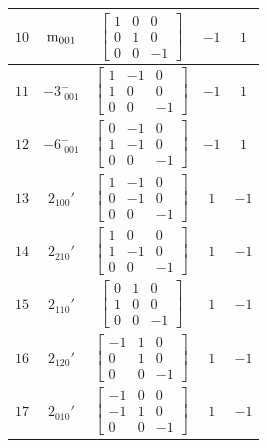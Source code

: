 \documentclass[fleqn,8pt]{jsarticle}
\begin{document}
\begin{longtable}{ccccc}
$ 10 $ & $ {\rm m}_{001} $ & $ \begin{bmatrix} 1 & 0 & 0 \\ 0 & 1 & 0 \\ 0 & 0 & -1 \end{bmatrix} $ & $ -1 $ & $ 1 $ \\ \hline
$ 11 $ & $ -3^{-}_{\,\,001} $ & $ \begin{bmatrix} 1 & -1 & 0 \\ 1 & 0 & 0 \\ 0 & 0 & -1 \end{bmatrix} $ & $ -1 $ & $ 1 $ \\ \hline
$ 12 $ & $ -6^{-}_{\,\,001} $ & $ \begin{bmatrix} 0 & -1 & 0 \\ 1 & -1 & 0 \\ 0 & 0 & -1 \end{bmatrix} $ & $ -1 $ & $ 1 $ \\ \hline
$ 13 $ & $ 2{}_{100}{}' $ & $ \begin{bmatrix} 1 & -1 & 0 \\ 0 & -1 & 0 \\ 0 & 0 & -1 \end{bmatrix} $ & $ 1 $ & $ -1 $ \\ \hline
$ 14 $ & $ 2{}_{210}{}' $ & $ \begin{bmatrix} 1 & 0 & 0 \\ 1 & -1 & 0 \\ 0 & 0 & -1 \end{bmatrix} $ & $ 1 $ & $ -1 $ \\ \hline
$ 15 $ & $ 2{}_{110}{}' $ & $ \begin{bmatrix} 0 & 1 & 0 \\ 1 & 0 & 0 \\ 0 & 0 & -1 \end{bmatrix} $ & $ 1 $ & $ -1 $ \\ \hline
$ 16 $ & $ 2{}_{120}{}' $ & $ \begin{bmatrix} -1 & 1 & 0 \\ 0 & 1 & 0 \\ 0 & 0 & -1 \end{bmatrix} $ & $ 1 $ & $ -1 $ \\ \hline
$ 17 $ & $ 2{}_{010}{}' $ & $ \begin{bmatrix} -1 & 0 & 0 \\ -1 & 1 & 0 \\ 0 & 0 & -1 \end{bmatrix} $ & $ 1 $ & $ -1 $ \\ \hline

\end{longtable}
\end{document}

